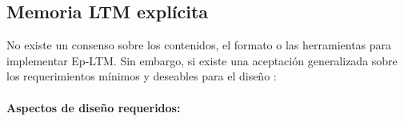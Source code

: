 \subsection{Memoria LTM explícita}\label{sec:ltm_exp}




No existe un consenso sobre los contenidos, el formato o las herramientas para implementar Ep-LTM.
Sin embargo, si existe una aceptación generalizada sobre los requerimientos mínimos y deseables para el diseño \cite{Vijayakumar2014, Ho2009,  Stachowicz2012, Jockel2008}:


\paragraph{Aspectos de diseño requeridos:}



